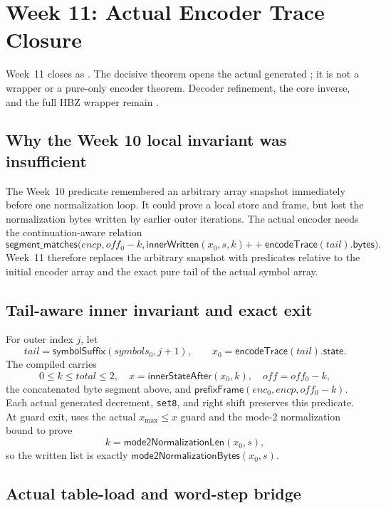 \section{Week 11: Actual Encoder Trace Closure}

Week~11 closes  as
.  The decisive
theorem opens the actual generated
; it is not a wrapper or a pure-only
encoder theorem.  Decoder refinement, the core inverse, and the full HBZ
wrapper remain .

\subsection*{Why the Week 10 local invariant was insufficient}

The Week~10 predicate remembered an arbitrary array snapshot immediately
before one normalization loop.  It could prove a local store and frame, but
lost the normalization bytes written by earlier outer iterations.  The actual
encoder needs the continuation-aware relation
\[
  \mathsf{segment\_matches}\bigl(
    encp,off_0-k,
    \mathsf{innerWritten}(x_0,s,k)
      \mathbin{++}
    \mathsf{encodeTrace}(tail).\mathsf{bytes}
  \bigr).
\]
Week~11 therefore replaces the arbitrary snapshot with predicates relative to
the initial encoder array and the exact pure tail of the actual symbol array.

\subsection*{Tail-aware inner invariant and exact exit}

For outer index $j$, let
\[
  tail=\mathsf{symbolSuffix}(symbols_0,j+1),\qquad
  x_0=\mathsf{encodeTrace}(tail).\mathsf{state}.
\]
The compiled  carries
\[
  0\le k\le total\le2,
  \quad x=\mathsf{innerStateAfter}(x_0,k),
  \quad off=off_0-k,
\]
the concatenated byte segment above, and
\(
  \mathsf{prefixFrame}(enc_0,encp,off_0-k)
\).
Each actual generated decrement, \texttt{set8}, and right shift preserves this
predicate.  At guard exit,
 uses the actual
\(x_{\max}\le x\) guard and the mode-2 normalization bound to prove
\[
  k=\mathsf{mode2NormalizationLen}(x_0,s),
\]
so the written list is exactly
\(\mathsf{mode2NormalizationBytes}(x_0,s)\).

\subsection*{Actual table-load and word-step bridge}

